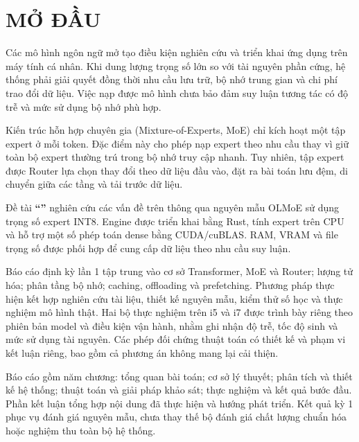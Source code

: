 \chapter*{MỞ ĐẦU}

Các mô hình ngôn ngữ mở tạo điều kiện nghiên cứu và triển khai ứng dụng trên máy tính cá nhân. Khi dung lượng trọng số lớn so với tài nguyên phần cứng, hệ thống phải giải quyết đồng thời nhu cầu lưu trữ, bộ nhớ trung gian và chi phí trao đổi dữ liệu. Việc nạp được mô hình chưa bảo đảm suy luận tương tác có độ trễ và mức sử dụng bộ nhớ phù hợp.

Kiến trúc hỗn hợp chuyên gia (Mixture-of-Experts, MoE) chỉ kích hoạt một tập expert ở mỗi token. Đặc điểm này cho phép nạp expert theo nhu cầu thay vì giữ toàn bộ expert thường trú trong bộ nhớ truy cập nhanh. Tuy nhiên, tập expert được Router lựa chọn thay đổi theo dữ liệu đầu vào, đặt ra bài toán lưu đệm, di chuyển giữa các tầng và tải trước dữ liệu.

Đề tài \textbf{``\reporttitle''} nghiên cứu các vấn đề trên thông qua nguyên mẫu OLMoE sử dụng trọng số expert INT8. Engine được triển khai bằng Rust, tính expert trên CPU và hỗ trợ một số phép toán dense bằng CUDA/cuBLAS. RAM, VRAM và file trọng số được phối hợp để cung cấp dữ liệu theo nhu cầu suy luận.

Báo cáo định kỳ lần 1 tập trung vào cơ sở Transformer, MoE và Router; lượng tử hóa; phân tầng bộ nhớ; caching, offloading và prefetching. Phương pháp thực hiện kết hợp nghiên cứu tài liệu, thiết kế nguyên mẫu, kiểm thử số học và thực nghiệm mô hình thật. Hai bộ thực nghiệm trên i5 và i7 được trình bày riêng theo phiên bản model và điều kiện vận hành, nhằm ghi nhận độ trễ, tốc độ sinh và mức sử dụng tài nguyên. Các phép đối chứng thuật toán có thiết kế và phạm vi kết luận riêng, bao gồm cả phương án không mang lại cải thiện.

Báo cáo gồm năm chương: tổng quan bài toán; cơ sở lý thuyết; phân tích và thiết kế hệ thống; thuật toán và giải pháp khảo sát; thực nghiệm và kết quả bước đầu. Phần kết luận tổng hợp nội dung đã thực hiện và hướng phát triển. Kết quả kỳ 1 phục vụ đánh giá nguyên mẫu, chưa thay thế bộ đánh giá chất lượng chuẩn hóa hoặc nghiệm thu toàn bộ hệ thống.

